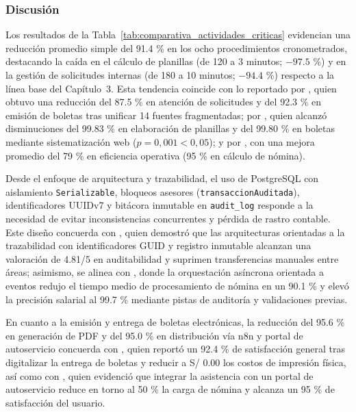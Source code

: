 \subsubsection{Discusión}
Los resultados de la Tabla~\ref{tab:comparativa_actividades_criticas} evidencian una reducción promedio simple del 91.4 
\% en los ocho procedimientos cronometrados, destacando la caída en el cálculo de planillas (de 120 a 3 minutos; $-97.5$ \%) 
y en la gestión de solicitudes internas (de 180 a 10 minutos; $-94.4$ \%) respecto a la línea base del Capítulo~3. 
Esta tendencia coincide con lo reportado por \textcite{pedroza2025propuesta}, quien obtuvo una reducción del 87.5 \% 
en atención de solicitudes y del 92.3 \% en emisión de boletas tras unificar 14 fuentes fragmentadas; 
por \textcite{fernandez2023implementacion}, quien alcanzó disminuciones del 99.83 \% 
en elaboración de planillas y del 99.80 \% en boletas mediante sistematización web 
($p = 0,001 < 0,05$); y por \textcite{beltran2021automatizacion}, 
con una mejora promedio del 79 \% en eficiencia operativa (95 \% en cálculo de nómina).

Desde el enfoque de arquitectura y trazabilidad, el uso de PostgreSQL con aislamiento \texttt{Serializable}, 
bloqueos asesores (\texttt{transaccionAuditada}), identificadores UUIDv7 y bitácora inmutable en \texttt{audit\_log} 
responde a la necesidad de evitar inconsistencias concurrentes y pérdida de rastro contable. 
Este diseño concuerda con \textcite{aliya2026design}, quien demostró que las arquitecturas orientadas a la trazabilidad 
con identificadores GUID y registro inmutable alcanzan una valoración de 4.81/5 en auditabilidad y 
suprimen transferencias manuales entre áreas; asimismo, se alinea con \textcite{chattopadhyay2026ai}, 
donde la orquestación asíncrona orientada a eventos redujo el tiempo medio de procesamiento de nómina en un 90.1 \% y 
elevó la precisión salarial al 99.7 \% mediante pistas de auditoría y validaciones previas.

En cuanto a la emisión y entrega de boletas electrónicas, la reducción del 95.6 \% en generación de PDF y del 95.0 \% 
en distribución vía n8n y portal de autoservicio concuerda con \textcite{aguilar2022desarrollo}, quien reportó un 92.4 \% 
de satisfacción general tras digitalizar la entrega de boletas y reducir a S/ 0.00 los costos de impresión física, 
así como con \textcite{someswari2025employee}, quien evidenció que integrar la asistencia con un portal de autoservicio 
reduce en torno al 50 \% la carga de nómina y alcanza un 95 \% de satisfacción del usuario.

